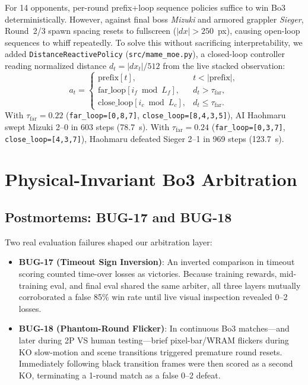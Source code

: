 \documentclass[10pt,twocolumn]{article}
\begin{document}
For 14 opponents, per-round prefix+loop sequence policies suffice to win Bo3 deterministically. However, against final boss \textit{Mizuki} and armored grappler \textit{Sieger}, Round~2/3 spawn spacing resets to fullscreen ($|dx| > 250$~px), causing open-loop sequences to whiff repeatedly. To solve this without sacrificing interpretability, we added \texttt{DistanceReactivePolicy} (\texttt{src/mame\_moe.py}), a closed-loop controller reading normalized distance $d_t = |dx_t|/512$ from the live stacked observation:
\begin{equation}
a_t = \begin{cases}
\text{prefix}[t], & t < |\text{prefix}|, \\
\text{far\_loop}[i_f \bmod L_f], & d_t > \tau_{\text{far}}, \\
\text{close\_loop}[i_c \bmod L_c], & d_t \le \tau_{\text{far}}.
\end{cases}
\end{equation}
With $\tau_{\text{far}} = 0.22$ (\texttt{far\_loop=[0,8,7]}, \texttt{close\_loop=[8,4,3,5]}), AI Haohmaru swept Mizuki 2--0 in 603 steps (78.7~s). With $\tau_{\text{far}} = 0.24$ (\texttt{far\_loop=[0,3,7]}, \texttt{close\_loop=[4,3,7]}), Haohmaru defeated Sieger 2--1 in 969 steps (123.7~s).

\section{Physical-Invariant Bo3 Arbitration}
\subsection{Postmortems: BUG-17 and BUG-18}
Two real evaluation failures shaped our arbitration layer:
\begin{itemize}
    \item \textbf{BUG-17 (Timeout Sign Inversion)}: An inverted comparison in timeout scoring counted time-over losses as victories. Because training rewards, mid-training eval, and final eval shared the same arbiter, all three layers mutually corroborated a false 85\% win rate until live visual inspection revealed 0--2 losses.
    \item \textbf{BUG-18 (Phantom-Round Flicker)}: In continuous Bo3 matches—and later during 2P VS human testing—brief pixel-bar/WRAM flickers during KO slow-motion and scene transitions triggered premature round resets. Immediately following black transition frames were then scored as a second KO, terminating a 1-round match as a false 0--2 defeat.
\end{itemize}
\end{document}
